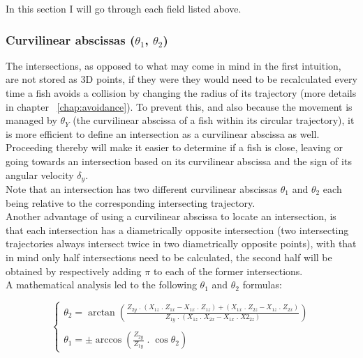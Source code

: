 In this section I will go through each field listed above.

\subsubsection{Curvilinear abscissas ($\theta_1$, $\theta_2$)}
The intersections, as opposed to what may come in mind in the first intuition, are not stored as 3D points, if they were they would need to be recalculated every time a fish avoids a collision by changing the radius of its trajectory (more details in chapter ~\ref{chap:avoidance}). To prevent this, and also because the movement is managed by $\theta_Y$ (the curvilinear abscissa of a fish within its circular trajectory), it is more efficient to define an intersection as a curvilinear abscissa as well. Proceeding thereby will make it easier to determine if a fish is close, leaving or going towards an intersection based on its curvilinear abscissa and the sign of its angular velocity $\delta _{y}$.\\

Note that an intersection has two different curvilinear abscissas $\theta_1$ and $\theta_2$ each being relative to the corresponding intersecting trajectory.\\

Another advantage of using a curvilinear abscissa to locate an intersection, is that each intersection has a diametrically opposite intersection (two intersecting trajectories always intersect twice in two diametrically opposite points), with that in mind only half intersections need to be calculated, the second half will be obtained by respectively adding $\pi$ to each of the former intersections.\\

A mathematical analysis led to the following $\theta_1$ and $\theta_2$ formulas:

\[
\left\{
\begin{array}{ll}
	\theta_2  = \arctan \left(
	\frac{\displaystyle Z_{2y} \;.\; (X_{1z} \;.\; Z_{1x} - X_{1x} \;.\; Z_{1z}) + (X_{1x} \;.\; Z_{2z} - X_{1z} \;.\; Z_{2x})}{\displaystyle Z_{1y} \;.\; (X_{1z} \;.\; X_{2x} - X_{1x} \;.\; X2_{2z})}
	\right) \\ \\
	
	\theta_1 = \pm \arccos\left(  \frac{\displaystyle Z_{2y}} {\displaystyle Z_{1y}} \;.\; \cos \theta_2 \right)
\end{array}
\right.
\]

